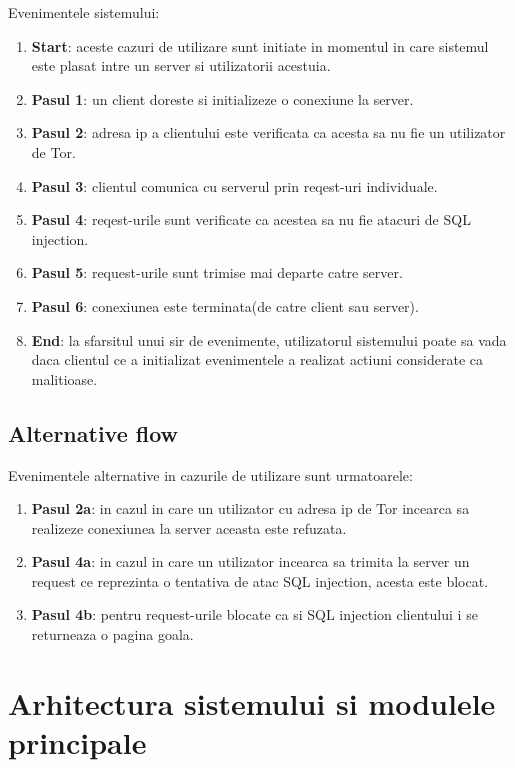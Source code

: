 Evenimentele sistemului:
\begin{enumerate}
	\item \textbf{Start}: aceste cazuri de utilizare sunt initiate in momentul in care sistemul este plasat intre un server si utilizatorii acestuia.
	\item \textbf{Pasul 1}: un client doreste si initializeze o conexiune la server.
	\item \textbf{Pasul 2}: adresa ip a clientului este verificata ca acesta sa nu fie un utilizator de Tor.
	\item \textbf{Pasul 3}: clientul comunica cu serverul prin reqest-uri individuale.
	\item \textbf{Pasul 4}: reqest-urile sunt verificate ca acestea sa nu fie atacuri de SQL injection.
	\item \textbf{Pasul 5}: request-urile sunt trimise mai departe catre server.
	\item \textbf{Pasul 6}: conexiunea este terminata(de catre client sau server).
	\item \textbf{End}: la sfarsitul unui sir de evenimente, utilizatorul sistemului poate sa vada daca clientul ce a initializat evenimentele a realizat actiuni considerate ca malitioase.
	
	
\end{enumerate}


\subsection{Alternative flow}
Evenimentele alternative in cazurile de utilizare sunt urmatoarele:
\begin{enumerate}
	\item \textbf{Pasul 2a}: in cazul in care un utilizator cu adresa ip de Tor incearca sa realizeze conexiunea la server aceasta este refuzata. 
	\item \textbf{Pasul 4a}: in cazul in care un utilizator incearca sa trimita la server un request ce reprezinta o tentativa de atac SQL injection, acesta este blocat.
	\item \textbf{Pasul 4b}: pentru request-urile blocate ca si SQL injection clientului i se returneaza o pagina goala. 
\end{enumerate}

\newpage


\section{Arhitectura sistemului si modulele principale}

